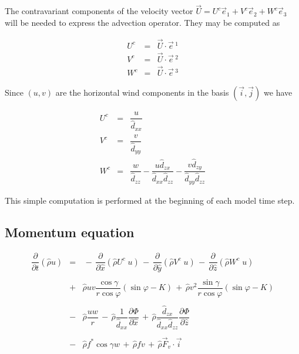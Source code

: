 The contravariant components of the velocity vector
 $\vec{U} = U^{c} \vec{e} _{1}+ V^{c} \vec{e} _{2}
 + W^{c} \vec{e} _{3} $ will be needed to express the advection operator.
They may be computed as

\begin{eqnarray}
U^{c} & = &  \vec{U} \cdot \vec{e}\, ^{1} \\
V^{c} & = &  \vec{U} \cdot \vec{e}\, ^{2} \\
W^{c} & = &\vec{U} \cdot \vec{e}\, ^{3}
\end{eqnarray}

Since $( u , v )$ are the horizontal wind components in the
basis  $( \vec{i}, \vec{j} )$ we have

\begin{eqnarray}
U^{c}&  =& \dfrac{ u }{\widehat{d}_{xx}} \\
V^{c}&  =& \dfrac{ v }{\widehat{d}_{yy}} \\
W^{c}&  =& \dfrac{ w}{\widehat{d}_{zz}}- \dfrac{ u \widehat{d}_{zx}}{\widehat{d}_{xx}\widehat{d}_{zz}}-
\dfrac{ v \widehat{d}_{zy}}{\widehat{d}_{yy}\widehat{d}_{zz}}
\end{eqnarray}

This simple computation is performed at the beginning of each model time
step.

\subsection{Momentum equation}

\begin{eqnarray}
\dfrac{\partial}{\partial t}(\widehat{\rho}  u ) &= &
 \, - \, \dfrac{\partial }{\partial \widehat{x}} (\widehat{\rho} U^{c } \;   u )
 \, - \, \dfrac{\partial }{\partial \widehat{y}} (\widehat{\rho} V^{c } \;    u )
 \, - \, \dfrac{\partial }{\partial \widehat{z}} (\widehat{\rho} W^{c }  \;    u )
\nonumber \\
& & \nonumber \\
&  + &\widehat{\rho}  u   v  \dfrac{ \cos\gamma}{r\cos\varphi} (\sin\varphi -K)
\,+ \,\widehat{\rho}  v ^{2} \dfrac{ \sin\gamma  }{r\cos\varphi} (\sin\varphi -K)
\nonumber \\
& & \nonumber \\
 & - & \widehat{\rho}\dfrac{ u  w}{r} \,  - \, \widehat{\rho}\dfrac{1}{\widehat{d}_{xx}} \dfrac{\partial \Phi}{\partial \widehat{x}}
\, + \,\widehat{\rho}\dfrac{\widehat{d}_{zx}}{\widehat{d}_{xx}\widehat{d}_{zz}} \dfrac{\partial \Phi}{\partial \widehat{z}} \nonumber \\
& & \nonumber \\
&  - & \widehat{\rho} f^{*} \cos\gamma w \, +  \, \widehat{\rho} f  v
\,+ \, \widehat{\rho} \vec{F}_{v} \cdot \vec{i}
\end{eqnarray}

